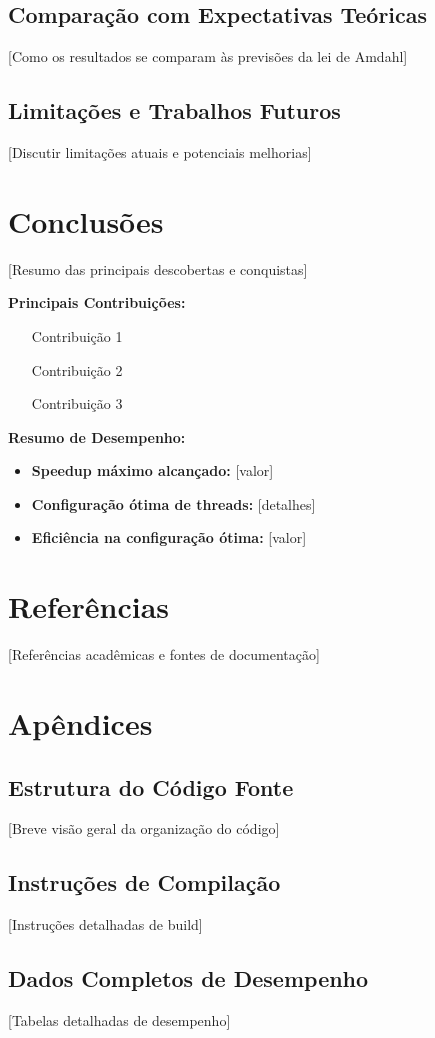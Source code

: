 \documentclass[a4paper,11pt]{article}
\begin{document}
\subsection{Comparação com Expectativas Teóricas}
[Como os resultados se comparam às previsões da lei de Amdahl]

\subsection{Limitações e Trabalhos Futuros}
[Discutir limitações atuais e potenciais melhorias]

\section{Conclusões}

[Resumo das principais descobertas e conquistas]

\textbf{Principais Contribuições:}
\begin{itemize}
    \item [Contribuição 1]
    \item [Contribuição 2]
    \item [Contribuição 3]
\end{itemize}

\textbf{Resumo de Desempenho:}
\begin{itemize}
    \item \textbf{Speedup máximo alcançado:} [valor]
    \item \textbf{Configuração ótima de threads:} [detalhes]
    \item \textbf{Eficiência na configuração ótima:} [valor]
\end{itemize}

\section{Referências}

[Referências acadêmicas e fontes de documentação]

\section{Apêndices}

\subsection{Estrutura do Código Fonte}
[Breve visão geral da organização do código]

\subsection{Instruções de Compilação}
[Instruções detalhadas de build]

\subsection{Dados Completos de Desempenho}
[Tabelas detalhadas de desempenho]
\end{document}
